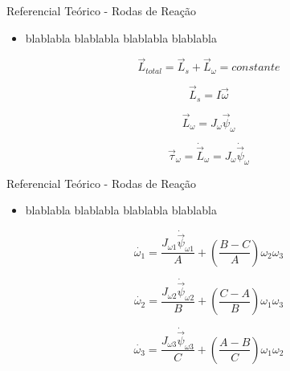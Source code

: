 \documentclass{beamer}
\begin{document}

\begin{frame}{Referencial Teórico - Rodas de Reação}
	\begin{itemize}
		\justifying
		\item blablabla blablabla blablabla blablabla
    \end{itemize}

	\begin{equation}\label{eq:ltot}
		\vec{L}_{total}=\vec{L}_s+\vec{L}_{\omega}=constante 
	\end{equation}

	\begin{equation}
		\vec{L}_s=I\vec{\omega}
	\end{equation}

	\begin{equation}
		\vec {L}_{\omega} =J_{\omega}\vec{\psi}_{\omega}
	\end{equation}

	\begin{equation}\label{eq:torqueedo}
		\vec{\tau}_{\omega}=\dot{\vec{L}}_{\omega}=J_{\omega}\dot{\vec{\psi}}_{\omega}
	\end{equation}
\end{frame}


\begin{frame}{Referencial Teórico - Rodas de Reação}
	\begin{itemize}
		\justifying
		\item blablabla blablabla blablabla blablabla
    \end{itemize}
	\begin{equation}\label{eq:modeloA}
	  \dot{\omega_{1}}=\frac{J_{\omega 1}\dot{\vec{\psi}}_{\omega 1}}{A}+\left(\frac{B-C}{A}\right)\omega_{2}\omega_{3}
	\end{equation}

	\begin{equation}\label{eq:modeloB}
	  \dot{\omega_{2}}=\frac{J_{\omega 2}\dot{\vec{\psi}}_{\omega 2}}{B}+\left(\frac{C-A}{B}\right)\omega_{1}\omega_{3}
	\end{equation}

	\begin{equation}\label{eq:modeloC}
	  \dot{\omega_{3}}=\frac{J_{\omega 3}\dot{\vec{\psi}}_{\omega 3}}{C}+\left(\frac{A-B}{C}\right)\omega_{1}\omega_{2}
	\end{equation}

\end{frame}
\end{document}
